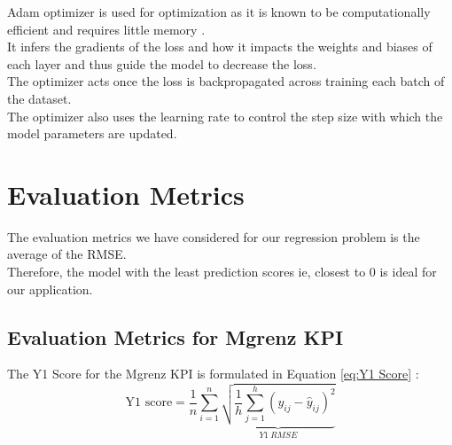\documentclass{report} %
\begin{document}
Adam optimizer is used for optimization as it is known to be computationally efficient and requires little memory \cite{ADAM-2017}. \\
It infers the gradients of the loss and how it impacts the weights and biases of each layer and thus guide the model to decrease the loss. \\
The optimizer acts once the loss is backpropagated across training each batch of the dataset.\\
The optimizer also uses the learning rate to control the step size with which the model parameters are updated.\\

\section{Evaluation Metrics}

The evaluation metrics we have considered for our regression problem is the average of the \ac{RMSE}. \\
Therefore, the model with the least prediction scores ie, closest to 0 is ideal for our application. \\

\subsection{Evaluation Metrics for Mgrenz \ac{KPI}}\label{sec:Evaluation Metrics for 2D KPI}

The Y1 Score for the Mgrenz \ac{KPI} is formulated in Equation \ref{eq:Y1 Score} :
\begin{equation}
\text{Y1 score} = \frac{1}{n} \sum_{i=1}^{n} \underbrace{ \sqrt{\frac{1}{h} \sum_{j=1}^{h} (y_{ij} - \hat{y}_{ij})^2}}_{Y1\ RMSE}
\label{eq:Y1 Score}
\end{equation}


\vspace{0.2cm} %
\end{document}
